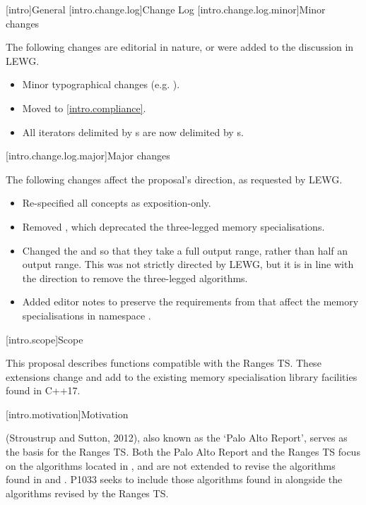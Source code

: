 [intro]{General}
[intro.change.log]{Change Log}
[intro.change.log.minor]{Minor changes}

The following changes are editorial in nature, or were added to the discussion
in LEWG.

\begin{itemize}
\item Minor typographical changes (e.g. ).
\item Moved  to \ref{intro.compliance}.
\item All  iterators delimited by s are now delimited by
      s.
\end{itemize}

[intro.change.log.major]{Major changes}

The following changes affect the proposal's direction, as requested by LEWG.

\begin{itemize}
\item Re-specified all concepts as exposition-only.
\item Removed , which deprecated the three-legged memory
      specialisations.
\item Changed the  and  so that they take a
      full output range, rather than half an output range. This was not strictly directed by LEWG,
      but it is in line with the direction to remove the three-legged algorithms.
\item Added editor notes to preserve the requirements from  that affect the
      memory specialisations in namespace .
\end{itemize}

[intro.scope]{Scope}

\pnum
This proposal describes functions compatible with the Ranges TS. These extensions change and add to
the existing memory specialisation library facilities found in C++17.

[intro.motivation]{Motivation}

\pnum
{} (Stroustrup and Sutton, 2012), also known as the
`Palo Alto Report', serves as the basis for the Ranges TS. Both the Palo Alto Report and the Ranges
TS focus on the algorithms located in , and are not extended to revise the
algorithms found in  and . P1033 seeks to include those algorithms
found in  alongside the algorithms revised by the Ranges TS.

